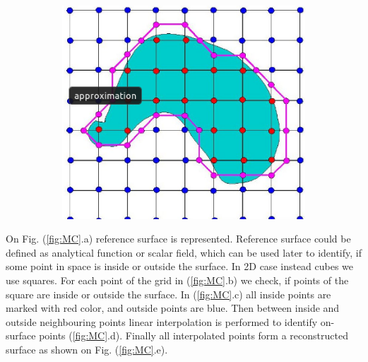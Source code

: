 \begin{figure}[!h]
\begin{minipage}{.25\textwidth}
\begin{subfigure}{\textwidth}
		\end{subfigure}
	\end{minipage}
	\hfill
	\begin{minipage}{.45\textwidth}
		\begin{subfigure}{\textwidth}
			\includegraphics[width=\textwidth]{figures/MC_surface.png}
		\end{subfigure}
	\end{minipage}
\end{figure}
On Fig. (\ref{fig:MC}.a) reference surface is represented. Reference surface could be defined as analytical function or scalar field, which can be used later to identify, if some point in space is inside or outside the surface. In 2D case instead cubes we use squares. For each point of the grid in (\ref{fig:MC}.b) we check, if points of the square are inside or outside the surface. In (\ref{fig:MC}.c) all inside points are marked with red color, and outside points are blue. Then between inside and outside neighbouring points linear interpolation is performed to identify on-surface points (\ref{fig:MC}.d). Finally all interpolated points form a reconstructed surface as shown on Fig. (\ref{fig:MC}.e).
